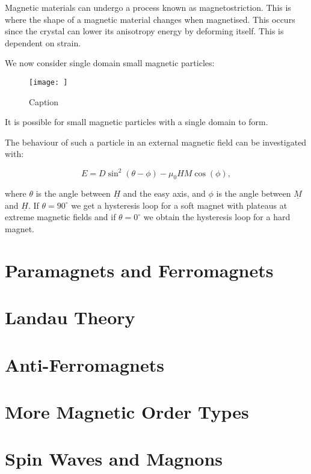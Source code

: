 Magnetic materials can undergo a process known as magnetostriction. This is where the shape of a magnetic material changes when magnetised. This occurs since the crystal can lower its anisotropy energy by deforming itself. This is dependent on strain.

\noindent We now consider single domain small magnetic particles:

\begin{figure}
    \centering
    \texttt{[image: ]}
    \caption{Caption}
    \label{fig:enter-label}
\end{figure}

\noindent It is possible for small magnetic particles with a single domain to form.

\noindent The behaviour of such a particle in an external magnetic field can be investigated with:

\begin{equation}
    E = D\sin^2(\theta - \phi) - \mu_0 H M \cos(\phi),
    \label{SingleDomainMagneticParticleEnergy}
\end{equation}

\noindent where $\theta$ is the angle between $\underline{H}$ and the easy axis, and $\phi$ is the angle between $\underline{M}$ and $\underline{H}$. If $\theta = 90^\circ$ we get a hysteresis loop for a soft magnet with plateaus at extreme magnetic fields and if $\theta = 0^\circ$ we obtain the hysteresis loop for a hard magnet.

\section{Paramagnets and Ferromagnets}

\section{Landau Theory}

\section{Anti-Ferromagnets}

\section{More Magnetic Order Types}

\section{Spin Waves and Magnons}